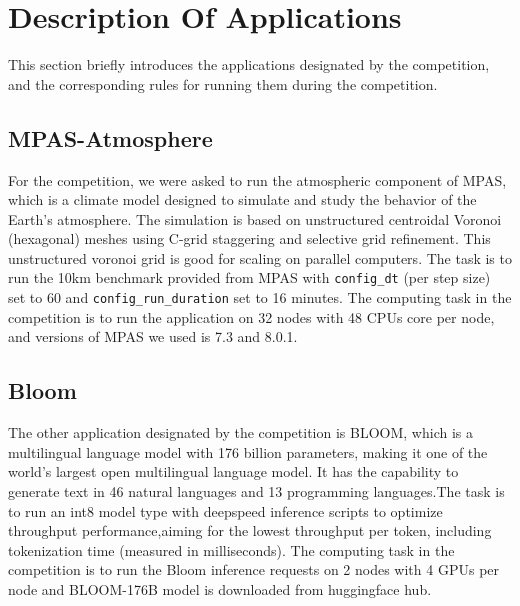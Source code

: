 \section{Description Of Applications}
\label{sec:app}

This section briefly introduces the applications designated by the competition, and the corresponding rules for running them during the competition.


\subsection{MPAS-Atmosphere}

For the competition, we were asked to run the atmospheric component of MPAS, which is a climate model designed to simulate and study the behavior of the Earth's atmosphere. The simulation is based on unstructured centroidal Voronoi (hexagonal) meshes using C-grid staggering and selective grid refinement. This unstructured voronoi grid is good for scaling on parallel computers. The task is to run the 10km benchmark provided from MPAS with \texttt{config\_dt} (per step size) set to 60 and \texttt{config\_run\_duration} set to 16 minutes. The computing task in the competition is to run the application on 32 nodes with 48 CPUs core per node, and versions of MPAS we used is 7.3 and 8.0.1.

\subsection{Bloom}
The other application designated by the competition is BLOOM, which is a multilingual language model with 176 billion parameters, making it one of the world's largest open multilingual language model. It has the capability to generate text in 46 natural languages and 13 programming languages.The task is to run an int8 model type with deepspeed inference scripts to optimize throughput performance,aiming for the lowest throughput per token, including tokenization time (measured in milliseconds). The computing task in the competition is to run the Bloom inference requests on 2 nodes with 4 GPUs per node and BLOOM-176B model is downloaded from huggingface hub.